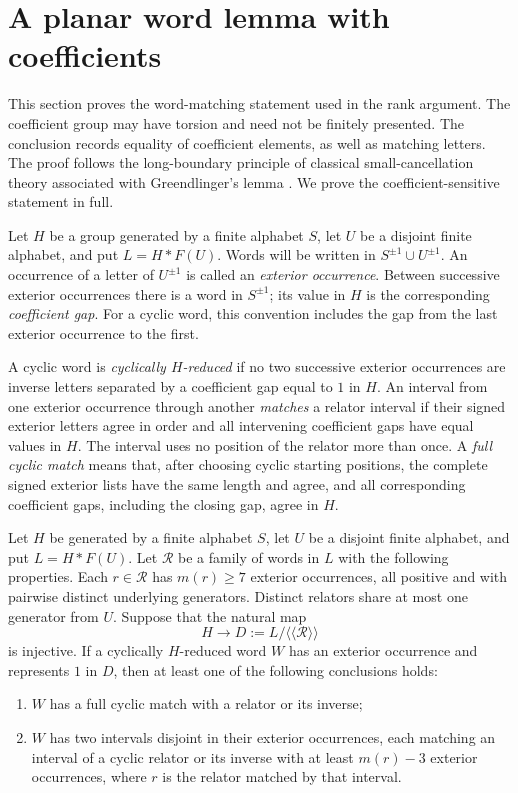 \section{A planar word lemma with coefficients}
\label{planar:section}

This section proves the word-matching statement used in the rank argument.
The coefficient group may have torsion and need not be finitely presented.
The conclusion records equality of coefficient elements, as well as matching
letters. The proof follows the long-boundary principle of classical
small-cancellation theory associated with Greendlinger's lemma
\cite{greendlinger-1960}. We prove the coefficient-sensitive statement
in full.

Let $H$ be a group generated by a finite alphabet $S$, let $U$ be a disjoint
finite alphabet, and put $L=H*F(U)$.  Words will be written in
$S^{\pm1}\cup U^{\pm1}$.  An occurrence of a letter of $U^{\pm1}$ is called
an \emph{exterior occurrence}.  Between successive exterior occurrences
there is a word in $S^{\pm1}$; its value in $H$ is the corresponding
\emph{coefficient gap}.  For a cyclic word, this convention includes the
gap from the last exterior occurrence to the first.

A cyclic word is \emph{cyclically $H$-reduced} if no two successive
exterior occurrences are inverse letters separated by a coefficient gap
equal to $1$ in $H$.  An interval from one exterior occurrence through
another \emph{matches} a relator interval if their signed exterior letters
agree in order and all intervening coefficient gaps have equal values in
$H$.  The interval uses no position of the relator more than once.  A
\emph{full cyclic match} means that, after choosing cyclic starting
positions, the complete signed exterior lists have the same length and
agree, and all corresponding coefficient gaps, including the closing
gap, agree in $H$.

\begin{lemma}
\label{planar:main}
Let $H$ be generated by a finite alphabet $S$, let $U$ be a disjoint
finite alphabet, and put $L=H*F(U)$. Let $\mathcal R$ be a family of
words in $L$ with the following properties.
Each $r\in\mathcal R$ has $m(r)\geq 7$ exterior occurrences, all positive
and with pairwise distinct underlying generators.  Distinct relators
share at most one generator from $U$.  Suppose that the natural map
\[
 H\longrightarrow D
 :=L/\langle\!\langle\mathcal R\rangle\!\rangle
\]
is injective.  If a cyclically $H$-reduced word $W$ has an exterior
occurrence and represents $1$ in $D$, then at least one of the following
conclusions holds:
\begin{enumerate}
\item $W$ has a full cyclic match with a relator or its inverse;
\item $W$ has two intervals disjoint in their exterior occurrences, each
  matching an interval of a cyclic relator or its inverse with at least
  $m(r)-3$ exterior occurrences, where $r$ is the relator matched by that
  interval.
\end{enumerate}
\end{lemma}

